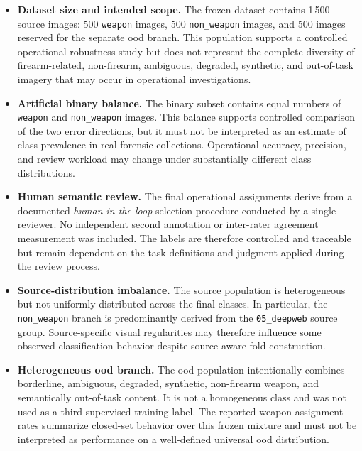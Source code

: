 \begin{itemize}

\item \textbf{Dataset size and intended scope.}
The frozen dataset contains 1\,500 source images: 500 \texttt{weapon} images,
500 \texttt{non\_weapon} images, and 500 images reserved for the separate
\gls{ood} branch. This population supports a controlled operational robustness
study but does not represent the complete diversity of firearm-related,
non-firearm, ambiguous, degraded, synthetic, and out-of-task imagery that may
occur in operational investigations.

\item \textbf{Artificial binary balance.}
The binary subset contains equal numbers of \texttt{weapon} and
\texttt{non\_weapon} images. This balance supports controlled comparison of the
two error directions, but it must not be interpreted as an estimate of class
prevalence in real forensic collections. Operational accuracy, precision, and
review workload may change under substantially different class distributions.

\item \textbf{Human semantic review.}
The final operational assignments derive from a documented
\textit{human-in-the-loop} selection procedure conducted by a single reviewer.
No independent second annotation or inter-rater agreement measurement was
included. The labels are therefore controlled and traceable but remain
dependent on the task definitions and judgment applied during the review
process.

\item \textbf{Source-distribution imbalance.}
The source population is heterogeneous but not uniformly distributed across
the final classes. In particular, the \texttt{non\_weapon} branch is
predominantly derived from the \texttt{05\_deepweb} source group.
Source-specific visual regularities may therefore influence some observed
classification behavior despite source-aware fold construction.

\item \textbf{Heterogeneous \gls{ood} branch.}
The \gls{ood} population intentionally combines borderline, ambiguous,
degraded, synthetic, non-firearm weapon, and semantically out-of-task content.
It is not a homogeneous class and was not used as a third supervised training
label. The reported weapon assignment rates summarize closed-set behavior over
this frozen mixture and must not be interpreted as performance on a
well-defined universal \gls{ood} distribution.


\end{itemize}
